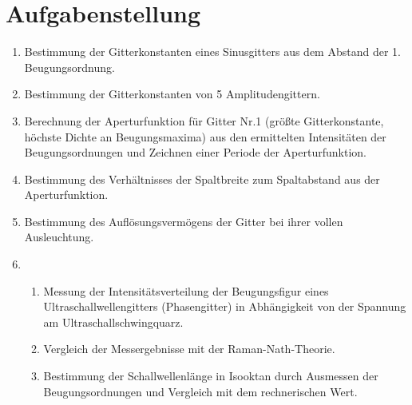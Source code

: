 \section{Aufgabenstellung}
\begin{enumerate}
 \item Bestimmung der Gitterkonstanten eines Sinusgitters aus dem Abstand der 1. Beugungsordnung.
\item Bestimmung der Gitterkonstanten von 5 Amplitudengittern.
\item Berechnung der Aperturfunktion für Gitter Nr.1 (größte Gitterkonstante,
      höchste Dichte an Beugungsmaxima) aus den ermittelten Intensitäten der
      Beugungsordnungen und Zeichnen einer Periode der Aperturfunktion.
\item Bestimmung des Verhältnisses der Spaltbreite zum Spaltabstand aus der
      Aperturfunktion.
\item Bestimmung des Auflösungsvermögens der Gitter bei ihrer vollen Ausleuchtung.
\item
  \begin{enumerate}
    \item Messung der Intensitätsverteilung der Beugungsfigur eines Ultraschallwellengitters (Phasengitter)
	in Abhängigkeit von der Spannung am Ultraschallschwingquarz.
    \item Vergleich der Messergebnisse mit der Raman-Nath-Theorie.
    \item Bestimmung der Schallwellenlänge in Isooktan durch Ausmessen der Beugungsordnungen und Vergleich mit dem rechnerischen Wert.
  \end{enumerate}
\end{enumerate}
